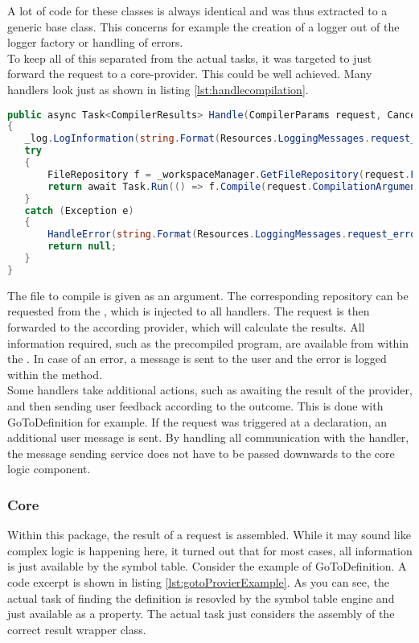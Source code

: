 A lot of code for these classes is always identical and was thus extracted to a generic base class.
This concerns for example the creation of a logger out of the logger factory or handling of errors.\\

To keep all of this separated from the actual tasks, it was targeted to just forward the request to a core-provider.
This could be well achieved.
Many handlers look just as shown in listing \ref{lst:handlecompilation}.

\begin{lstlisting}[language=csharp, caption={Handling Compilation}, captionpos=b, label={lst:handlecompilation}]
public async Task<CompilerResults> Handle(CompilerParams request, CancellationToken cancellationToken)
{
   _log.LogInformation(string.Format(Resources.LoggingMessages.request_handle, _method));
   try
   {
       FileRepository f = _workspaceManager.GetFileRepository(request.FileToCompile);
       return await Task.Run(() => f.Compile(request.CompilationArguments), cancellationToken);
   }
   catch (Exception e)
   {
       HandleError(string.Format(Resources.LoggingMessages.request_error, _method), e);
       return null;
   }
}
\end{lstlisting}

The file to compile is given as an argument.
The corresponding repository can be requested from the , which is injected to all handlers.
The request is then forwarded to the according provider, which will calculate the results.
All information required, such as the precompiled program, are available from within the .
In case of an error, a message is sent to the user and the error is logged within the  method.\\

Some handlers take additional actions, such as awaiting the result of the provider, and then sending user feedback according to the outcome.
This is done with GoToDefinition for example.
If the request was triggered at a declaration, an additional user message is sent.
By handling all communication with the handler, the message sending service does not have to be passed downwards to the core logic component.


\subsubsection{Core}
Within this package, the result of a request is assembled.
While it may sound like complex logic is happening here, it turned out that for most cases, all information is just available by the symbol table.
Consider the example of GoToDefinition.
A code excerpt is shown in listing \ref{lst:gotoProvierExample}.
As you can see, the actual task of finding the definition is resovled by the symbol table engine and just available as a property.
The actual task just considers the assembly of the correct result wrapper class.

